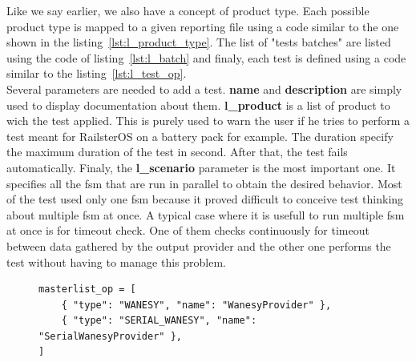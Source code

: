 \documentclass[12pt]{article}
\begin{document}
Like we say earlier, we also have a concept of product type. Each possible product type is mapped to a given reporting file using a code similar to the one shown in the listing~\ref{lst:l_product_type}. The list of "tests batches" are listed using the code of listing~\ref{lst:l_batch} and finaly, each test is defined using a code similar to the listing~\ref{lst:l_test_op}.\\

Several parameters are needed to add a test. \textbf{name} and \textbf{description} are simply used to display documentation about them. \textbf{l\_product} is a list of product to wich the test applied. This is purely used to warn the user if he tries to perform a test meant for RailsterOS on a battery pack for example. The duration specify the maximum duration of the test in second. After that, the test fails automatically. Finaly, the \textbf{l\_scenario} parameter is the most important one. It specifies all the \gls{fsm} that are run in parallel to obtain the desired behavior. Most of the test used only one \gls{fsm} because it proved difficult to conceive test thinking about multiple \gls{fsm} at once. A typical case where it is usefull to run multiple \gls{fsm} at once is for timeout check. One of them checks continuously for timeout between data gathered by the output provider and the other one performs the test without having to manage this problem.\\

\begin{figure}
    \label{masterlist_op}
    \begin{lstlisting}[frame=single,caption="Output provider configuration",label={lst:masterlist_op}]
masterlist_op = [
    { "type": "WANESY", "name": "WanesyProvider" },
    { "type": "SERIAL_WANESY", "name": "SerialWanesyProvider" },
]
    \end{lstlisting}
\end{figure}
\end{document}
